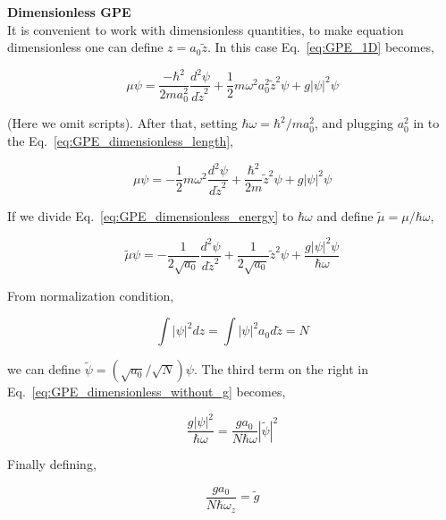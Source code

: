 \documentclass[a4paper,times,12pt]{article}
\begin{document}
\textbf{Dimensionless GPE}\\

It is convenient to work with dimensionless quantities, to make equation dimensionless one can define $z = a_0\widetilde{z}$. In this case Eq.~\ref{eq:GPE_1D} becomes,

\begin{equation}
\label{eq:GPE_dimensionless_length}
\mu\psi = \frac{-\hbar^2}{2ma_0^2}\frac{d^2\psi}{d\widetilde{z}^2} + \frac{1}{2}m\omega^2 a_0^2 \widetilde{z}^2\psi + g|\psi|^2\psi
\end{equation}

(Here we omit scripts). After that, setting $\hbar\omega = {\hbar^2}/{m a_0^2}$, and plugging $a_0^2$ in to the Eq.~\ref{eq:GPE_dimensionless_length},

\begin{equation}
\label{eq:GPE_dimensionless_energy}
\mu\psi = -\frac{1}{2}m\omega^2\frac{d^2\psi}{d\widetilde{z}^2} + \frac{\hbar^2}{2m}\widetilde{z}^2\psi + g|\psi|^2\psi
\end{equation}

If we divide Eq.~\ref{eq:GPE_dimensionless_energy} to $\hbar\omega$ and define $\widetilde{\mu} = \mu/\hbar\omega$,

\begin{equation}
\label{eq:GPE_dimensionless_without_g}
\widetilde{\mu} \psi = -\frac{1}{2\sqrt{a_0}}\frac{d^2\psi}{d\widetilde{z}^2} + \frac{1}{2\sqrt{a_0}}\widetilde{z}^2\psi + \frac{g|\psi|^2\psi}{\hbar\omega}
\end{equation}

From normalization condition,

\begin{equation}
\int |\psi|^2dz = \int |\psi|^2 a_0 d\widetilde{z} = N
\end{equation}

we can define $\widetilde{\psi} = ({\sqrt{a_0}}/{\sqrt{N}})\psi$. The third term on the right in Eq.~\ref{eq:GPE_dimensionless_without_g} becomes,

\begin{equation}
\label{eq:GPE_dimensionless_g_1}
\frac{g|\psi|^2}{\hbar\omega} = \frac{g a_0}{N\hbar\omega}|\widetilde{\psi}|^2 
\end{equation}

Finally defining,

\begin{equation}
\label{eq:GPE_dimensionless_g_2}
\frac{g a_0}{N\hbar\omega_z} = \widetilde{g}
\end{equation}
\end{document}
